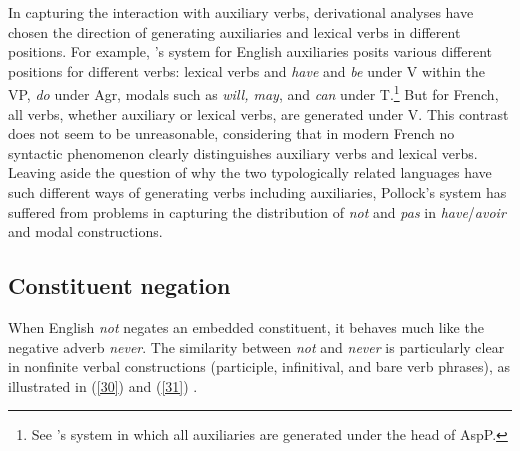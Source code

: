 \documentclass[output=paper
                ,modfonts
                		,nonflat
	        ,collection
	        ,collectionchapter
	        ,collectiontoclongg
 	        ,biblatex
                ,babelshorthands
                ,newtxmath
                ,draftmode
                ,colorlinks, citecolor=brown
]{./langsci/langscibook}
\begin{document}
{\begin{exe}
\begin{xlist}
\begin{exe}
\begin{xlist}
{In capturing the interaction with auxiliary verbs, derivational analyses have chosen the direction of generating
auxiliaries and lexical  verbs in different positions. For example,
\citet{Pollock:89}'s system for English auxiliaries posits
various different positions for different verbs: lexical
verbs and \textit{have} and \textit{be} under V within the VP,
\textit{do} under Agr, modals such as \textit{will, may}, and \textit{can}
under T.\footnote{See \citep{Ouhalla:91}'s system in which
all auxiliaries are generated under the head of AspP.} But for French,
all verbs, whether
auxiliary or lexical  verbs, are generated under V.
This contrast does not seem to be unreasonable, considering that in
modern French no syntactic phenomenon clearly distinguishes auxiliary
verbs and lexical  verbs. Leaving aside the question of why the two
typologically related languages have such different ways of generating
verbs including auxiliaries, Pollock's system has suffered
from problems in capturing the distribution of \textit{not} and
\textit{pas} in \textit{have}/\textit{avoir} and modal constructions.}
\fi

\subsection{Constituent negation}

When English \textit{not} negates an embedded constituent, it behaves
much like the negative adverb \textit{never}. The similarity between {\it
not} and \textit{never} is particularly clear in nonfinite verbal
constructions (participle, infinitival, and bare verb phrases), as
illustrated in (\ref{30}) and (\ref{31}) \citep{Klima:64, Baker:89,Baker:91}.

\eal\label{30}
\zl


\end{xlist}
\end{exe}
\end{xlist}
\end{exe}}
\end{document}
